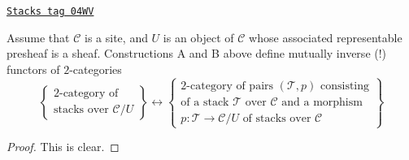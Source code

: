 \begin{lemma}
\label{stacks-lemma-localize-stacks}
\href{https://stacks.math.columbia.edu/tag/04WV}{\texttt{Stacks tag 04WV}}

Assume that $\mathcal{C}$ is a site,
and $U$ is an object of $\mathcal{C}$ whose associated representable
presheaf is a sheaf. Constructions A and B above define
mutually inverse (!) functors of $2$-categories
$$
\left\{
\begin{matrix}
2\text{-category of}\\
\text{stacks over }\mathcal{C}/U
\end{matrix}
\right\}
\leftrightarrow
\left\{
\begin{matrix}
2\text{-category of pairs }(\mathcal{T}, p)
\text{ consisting} \\
\text{of a stack }\mathcal{T}\text{ over }\mathcal{C}\text{ and a morphism} \\
p : \mathcal{T} \to \mathcal{C}/U\text{ of stacks over }\mathcal{C}
\end{matrix}
\right\}
$$
\end{lemma}

\begin{proof}
This is clear.
\end{proof}



